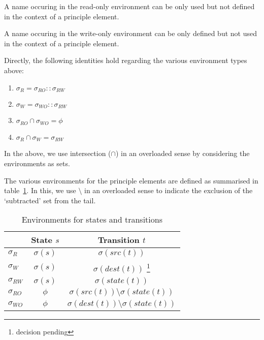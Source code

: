 \documentclass[12pt,a4paper]{report}
\begin{document}
\begin{definition}
	A name occuring in the read-only environment can be only used but not defined in the context of a principle element. 
\end{definition}


\begin{definition}
	A name occuring in the write-only environment can be only defined but not used in the context of a principle element. 
\end{definition}

Directly, the following identities hold regarding the various environment types above:
\begin{enumerate}
	\item $\sigma_R = \sigma_{RO} :: \sigma_{RW}$
	\item $\sigma_W = \sigma_{WO} :: \sigma_{RW}$
	\item $\sigma_{RO} \cap \sigma_{WO} = \phi$
	\item $\sigma_{R} \cap \sigma_{W} = \sigma_{RW}$
\end{enumerate}

In the above, we use intersection ($\cap$) in an overloaded sense by considering the environments as sets.

The various environments for the principle elements are defined as summarised in table~\ref{t:env}. In this, we use $\setminus$ in an overloaded sense to indicate the exclusion of the `subtracted' set from the tail.
 
\begin{table}
\begin{center}
\begin{tabular}{| l | c | c |}
\hline
	          & \textbf{State} $s$   & \textbf{Transition} $t$ \\
\hline
	$\sigma_R$ & $\sigma(s)$ & $\sigma(src(t))$ \\
	$\sigma_W$ & $\sigma(s)$ & $\sigma(dest(t))$ \footnote{decision pending} \\
	$\sigma_{RW}$ & $\sigma(s)$ & $\sigma(state(t))$ \\
	$\sigma_{RO}$ & $\phi$ & $\sigma(src(t)) \setminus \sigma(state(t))$ \\
	$\sigma_{WO}$ & $\phi$ & $\sigma(dest(t)) \setminus \sigma(state(t))$ \\
\hline
\end{tabular}
\end{center}
\caption{Environments for states and transitions}
\label{t:env}
\end{table}
\end{document}
